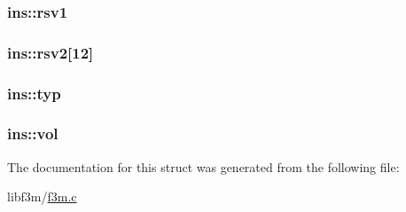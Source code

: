 \subsubsection[{rsv1}]{ ins\+::rsv1}\label{structins_aa3e4bfa21fdcadeadd75fb7b3baf224d}
\hypertarget{structins_af7e0a78e5b2330fd23f12476acb565bd}{}
\subsubsection[{rsv2}]{ ins\+::rsv2\mbox{[}12\mbox{]}}\label{structins_af7e0a78e5b2330fd23f12476acb565bd}
\hypertarget{structins_a59e5fac19c5b9fde60f045f1cd44f695}{}
\subsubsection[{typ}]{ ins\+::typ}\label{structins_a59e5fac19c5b9fde60f045f1cd44f695}
\hypertarget{structins_ada1b49154d9c1d8050da37526a18335b}{}
\subsubsection[{vol}]{ ins\+::vol}\label{structins_ada1b49154d9c1d8050da37526a18335b}


The documentation for this struct was generated from the following file\+:\begin{DoxyCompactItemize}
\item 
libf3m/\hyperlink{f3m_8c}{f3m.\+c}\end{DoxyCompactItemize}

